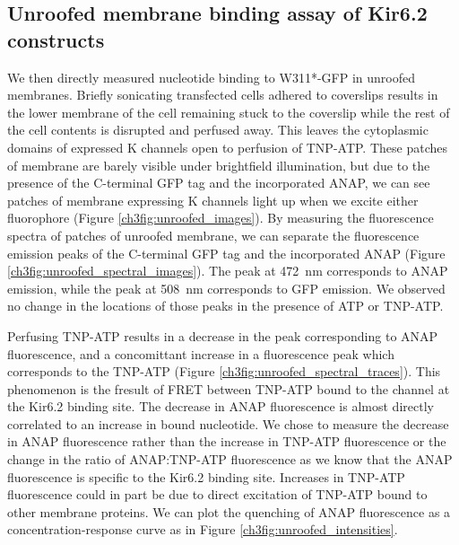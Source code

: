 \subsection{Unroofed membrane binding assay of Kir6.2 constructs}

We then directly measured nucleotide binding to W311*-GFP in unroofed membranes.
Briefly sonicating transfected cells adhered to coverslips results in the lower membrane of the cell remaining stuck to the coverslip while the rest of the cell contents is disrupted and perfused away.
This leaves the cytoplasmic domains of expressed K\ATP{} channels open to perfusion of TNP-ATP.
These patches of membrane are barely visible under brightfield illumination, but due to the presence of the C-terminal GFP tag and the incorporated ANAP, we can see patches of membrane expressing K\ATP{} channels light up when we excite either fluorophore (Figure \ref{ch3fig:unroofed_images}).
By measuring the fluorescence spectra of patches of unroofed membrane, we can separate the fluorescence emission peaks of the C-terminal GFP tag and the incorporated ANAP (Figure \ref{ch3fig:unroofed_spectral_images}).
The peak at \SI{472}{\nano\metre} corresponds to ANAP emission, while the peak at \SI{508}{\nano\metre} corresponds to GFP emission.
We observed no change in the locations of those peaks in the presence of ATP or TNP-ATP.

Perfusing TNP-ATP results in a decrease in the peak corresponding to ANAP fluorescence, and a concomittant increase in a fluorescence peak which corresponds to the TNP-ATP (Figure \ref{ch3fig:unroofed_spectral_traces}).
This phenomenon is the fresult of FRET between TNP-ATP bound to the channel at the Kir6.2 binding site.
The decrease in ANAP fluorescence is almost directly correlated to an increase in bound nucleotide.
We chose to measure the decrease in ANAP fluorescence rather than the increase in TNP-ATP fluorescence or the change in the ratio of ANAP:TNP-ATP fluorescence as we know that the ANAP fluorescence is specific to the Kir6.2 binding site.
Increases in TNP-ATP fluorescence could in part be due to direct excitation of TNP-ATP bound to other membrane proteins.
We can plot the quenching of ANAP fluorescence as a concentration-response curve as in Figure \ref{ch3fig:unroofed_intensities}.

